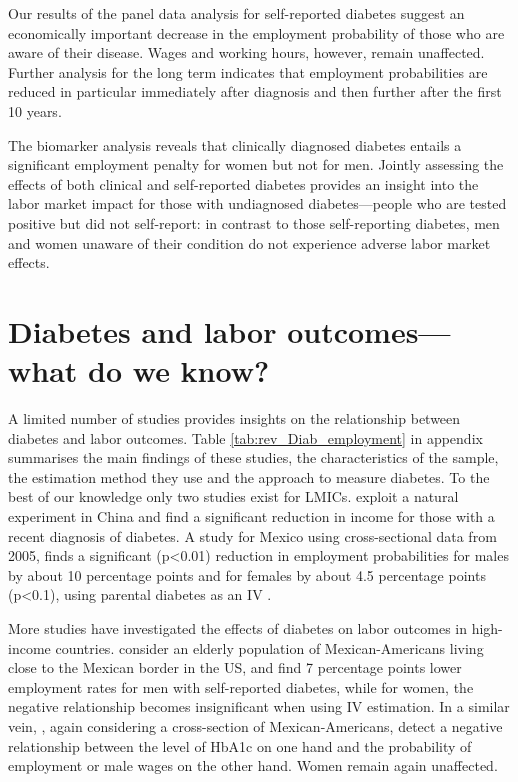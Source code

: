 \documentclass[12pt,english]{article}
\begin{document}
Our results of the panel data analysis for self-reported diabetes suggest an economically important decrease in the employment probability of those who are aware of their disease. Wages and working hours, however, remain unaffected. Further analysis for the long term indicates that employment probabilities are reduced in particular immediately after diagnosis and then further after the first 10 years.

The biomarker analysis reveals that clinically diagnosed diabetes entails a significant employment penalty for women but not for men. Jointly assessing the effects of both clinical and self-reported diabetes provides an insight into the labor market impact for those with undiagnosed diabetes---people who are tested positive but did not self-report: in contrast to those self-reporting diabetes, men and women unaware of their condition do not experience adverse labor market effects.	 


\section{\label{sec:labor  outcomes and diabetes literature}Diabetes and labor outcomes---what do we know?}

A limited number of studies provides insights on the relationship between diabetes and labor outcomes.  Table \ref{tab:rev_Diab_employment} in appendix summarises the main findings of these studies, the characteristics of the sample, the estimation method they use and the approach to measure diabetes.  To the best of our knowledge only two studies exist for \acp{LMIC}. \textcite{Liu2014} exploit a natural experiment in China and find a significant reduction in income for those with a recent diagnosis of diabetes. A study for Mexico using cross-sectional data from 2005, finds a significant (p<0.01) reduction in employment probabilities for males by about 10 percentage points and for females by about 4.5 percentage points (p<0.1), using parental diabetes as an \ac{IV} \parencite{Seuring2015}.

More studies have investigated the effects of diabetes on labor outcomes in high-income countries. \textcite{Brown2005} consider an elderly population of Mexican-Americans living close to the Mexican border in the US, and find 7 percentage points lower employment rates for men with self-reported diabetes, while for women, the negative relationship becomes insignificant when using \ac{IV} estimation.  In a similar vein, \textcite{BrownIII2011}, again considering a cross-section of Mexican-Americans, detect a negative  relationship between the level of \ac{HbA1c} on one hand and the probability of employment or male wages on the other hand. Women remain again unaffected.  
\end{document}
